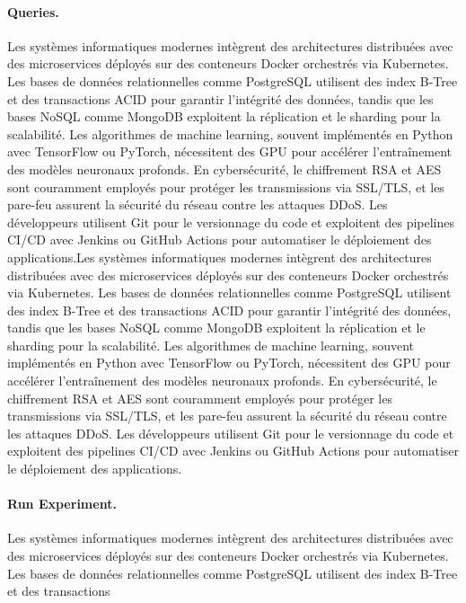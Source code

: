 \paragraph{Queries.}
\label{par:eval-queries}
Les systèmes informatiques modernes intègrent des architectures distribuées avec des microservices déployés sur des conteneurs Docker orchestrés via Kubernetes. Les bases de données relationnelles comme PostgreSQL utilisent des index B-Tree et des transactions ACID pour garantir l'intégrité des données, tandis que les bases NoSQL comme MongoDB exploitent la réplication et le sharding pour la scalabilité. Les algorithmes de machine learning, souvent implémentés en Python avec TensorFlow ou PyTorch, nécessitent des GPU pour accélérer l'entraînement des modèles neuronaux profonds. En cybersécurité, le chiffrement RSA et AES sont couramment employés pour protéger les transmissions via SSL/TLS, et les pare-feu assurent la sécurité du réseau contre les attaques DDoS. Les développeurs utilisent Git pour le versionnage du code et exploitent des pipelines CI/CD avec Jenkins ou GitHub Actions pour automatiser le déploiement des applications.Les systèmes informatiques modernes intègrent des architectures distribuées avec des microservices déployés sur des conteneurs Docker orchestrés via Kubernetes. Les bases de données relationnelles comme PostgreSQL utilisent des index B-Tree et des transactions ACID pour garantir l'intégrité des données, tandis que les bases NoSQL comme MongoDB exploitent la réplication et le sharding pour la scalabilité. Les algorithmes de machine learning, souvent implémentés en Python avec TensorFlow ou PyTorch, nécessitent des GPU pour accélérer l'entraînement des modèles neuronaux profonds. En cybersécurité, le chiffrement RSA et AES sont couramment employés pour protéger les transmissions via SSL/TLS, et les pare-feu assurent la sécurité du réseau contre les attaques DDoS. Les développeurs utilisent Git pour le versionnage du code et exploitent des pipelines CI/CD avec Jenkins ou GitHub Actions pour automatiser le déploiement des applications.












\paragraph{Run Experiment.}
\label{par:eval-run-experiment}
Les systèmes informatiques modernes intègrent des architectures distribuées avec des microservices déployés sur des conteneurs Docker orchestrés via Kubernetes. Les bases de données relationnelles comme PostgreSQL utilisent des index B-Tree et des transactions 

